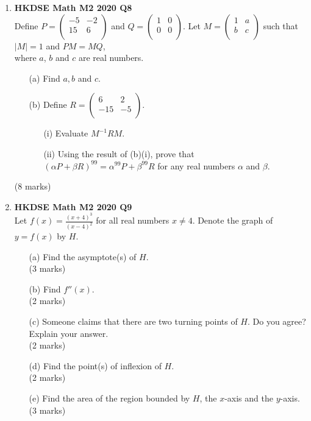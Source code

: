 \documentclass{report}
\begin{document}
\begin{enumerate}
	\item \textbf{HKDSE Math M2 2020 Q8}\\
	Define $P = \begin{pmatrix}
				-5&-2\\
				15&6\\
				\end{pmatrix}$ and $Q = 
				\begin{pmatrix}
				1&0\\
				0&0\\
				\end{pmatrix}$. Let $M = 
				\begin{pmatrix}
				1&a\\
				b&c\\
			\end{pmatrix}$ such that $|M| = 1$ and $PM = MQ$, \\
	where $a$, $b$ and $c$ are real numbers.
	\begin{enumerate}
		\item [(a)] Find $a,b$ and $c$. 
		\item [(b)] Define $R = 
				\begin{pmatrix}
				6&2\\
				-15&-5\\
				\end{pmatrix}$. 
		\begin{enumerate}
			\item [(i)]Evaluate $M^{-1}RM$. 
			\item [(ii)]Using the result of (b)(i), prove that $(\alpha P + \beta R)^{99} = \alpha^{99}P+\beta ^{99}R$ for any real numbers $\alpha$ and $\beta$. 
		\end{enumerate} 
	\end{enumerate}
	(8 marks)

	\item \textbf{HKDSE Math M2 2020 Q9}\\
	Let $\displaystyle f(x) = \frac{(x+4)^3}{(x-4)^2}$ for all real numbers $x \neq 4$. Denote the graph of $y = f(x)$ by $H$.
	\begin{enumerate}
		\item [(a)] Find the asymptote(s) of $H$. \\(3 marks)
		\item [(b)] Find $f''(x)$. \\(2 marks)
		\item [(c)] Someone claims that there are two turning points of $H$. Do you agree? Explain your answer. \\(2 marks)
		\item [(d)] Find the point(s) of inflexion of $H$. \\(2 marks)
		\item [(e)] Find the area of the region bounded by $H$, the $x$-axis and the $y$-axis. \\(3 marks)
	\end{enumerate}


\end{enumerate}
\end{document}
